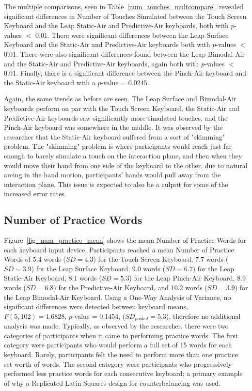 The multiple comparisons, seen in Table~\ref{num_touches_multcompare}, revealed significant differences in Number of Touches Simulated between the Touch Screen Keyboard and the Leap Static-Air and Predictive-Air keyboards, both with $p$-values $<$ 0.01. There were significant differences between the Leap Surface Keyboard and the Static-Air and Predictive-Air keyboards both with $p$-values $<$ 0.01. There were also significant differences found between the Leap Bimodal-Air and the Static-Air and Predictive-Air keyboards, again both with $p$-values $<$ 0.01. Finally, there is a significant difference between the Pinch-Air keyboard and the Static-Air keyboard with a $p$-value = 0.0245.

Again, the same trends as before are seen. The Leap Surface and Bimodal-Air keyboards perform on par with the Touch Screen Keyboard, the Static-Air and Predictive-Air keyboards saw significantly more simulated touches, and the Pinch-Air keyboard was somewhere in the middle. It was observed by the researcher that the Static-Air keyboard suffered from a sort of "skimming" problem. The "skimming" problem is where participants would reach just far enough to barely simulate a touch on the interaction plane, and then when they would move their hand from one side of the keyboard to the other, due to natural arcing in the hand motion, participants' hands would pull away from the interaction plane. This issue is expected to also be a culprit for some of the increased error rates.

\subsection{Number of Practice Words}
Figure~\ref{fig_num_practice_mean} shows the mean Number of Practice Words for each keyboard input device. Participants reached a mean Number of Practice Words of 5.4 words ($SD = 4.3$) for the Touch Screen Keyboard, 7.7 words ($SD = 3.9$) for the Leap Surface Keyboard, 9.0 words ($SD = 6.7$) for the Leap Static-Air Keyboard, 8.1 words ($SD = 5.3$) for the Leap Pinch-Air Keyboard, 8.9 words ($SD = 6.8$) for the Predictive-Air Keyboard, and 10.2 words ($SD = 3.9$) for the Leap Bimodal-Air Keyboard. Using a One-Way Analysis of Variance, no significant differences were detected between keyboard means, $F(5, 102) = 1.6828$, $p$-value = 0.1454, ($SD_{pooled} = 5.3$), therefore no additional analysis was made. Typically, as observed by the researcher, there were two categories of participants when it came to performing practice words. The first category were participants who would perform a full set of 15 words for each keyboard. Rarely, participants felt the need to perform more than one practice set worth of words. The second category were participants who progressively performed less practice words for each consecutive keyboard; a primary example of why a Replicated Latin Squares design for counterbalancing was used.

